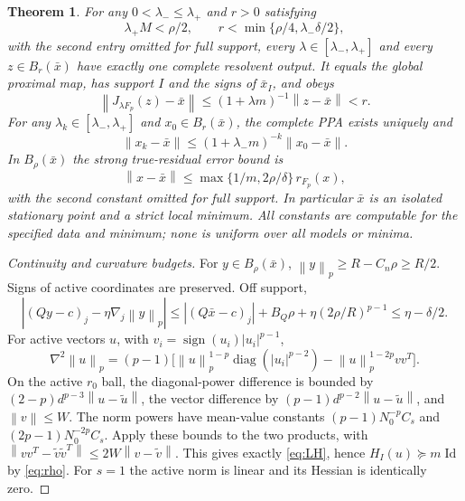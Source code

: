 \documentclass[11pt]{article}
\newcommand{\norm}[1]{\left\lVert#1\right\rVert}
\newcommand{\Id}{\operatorname{Id}}
\newtheorem{theorem}{Theorem}[section]
\theoremstyle{remark}\newtheorem{remark}[theorem]{Remark}
\begin{document}
\begin{theorem}\label{thm:fullprox}
For any $0<\lambda_-\le\lambda_+$ and $r>0$ satisfying
\begin{equation}\label{eq:windows}
 \lambda_+ M<\rho/2,\qquad
 r<\min\{\rho/4,\lambda_-\delta/2\},
\end{equation}
with the second entry omitted for full support, every
$\lambda\in[\lambda_-,\lambda_+]$ and every $z\in B_r(\bar x)$ have
exactly one complete resolvent output. It equals the global proximal
map, has support $I$ and the signs of $\bar x_I$, and obeys
\begin{equation}\label{eq:linear}
 \norm{J_{\lambda F_p}(z)-\bar x}
 \le(1+\lambda m)^{-1}\norm{z-\bar x}<r.
\end{equation}
For any $\lambda_k\in[\lambda_-,\lambda_+]$ and $x_0\in B_r(\bar x)$,
the complete PPA exists uniquely and
\[
 \norm{x_k-\bar x}\le(1+\lambda_-m)^{-k}\norm{x_0-\bar x}.
\]
In $B_\rho(\bar x)$ the strong true-residual error bound is
\begin{equation}\label{eq:linearEB}
 \norm{x-\bar x}\le\max\{1/m,2\rho/\delta\}\,r_{F_p}(x),
\end{equation}
with the second constant omitted for full support. In particular
$\bar x$ is an isolated stationary point and a strict local minimum.
All constants are computable for the specified data and minimum;
none is uniform over all models or minima.
\end{theorem}
\begin{proof}[Continuity and curvature budgets]
For $y\in B_\rho(\bar x)$, $\norm y_p\ge R-C_n\rho\ge R/2$.
Signs of active coordinates are preserved. Off support,
\[
 |(Qy-c)_j-\eta\nabla_j\norm y_p|
 \le |(Q\bar x-c)_j|+B_Q\rho+
                           \eta(2\rho/R)^{p-1}\le\eta-\delta/2.
\]
For active vectors $u$, with $v_i=\operatorname{sign}(u_i)|u_i|^{p-1}$,
\[
 \nabla^2\norm u_p=(p-1)
 \big[\norm u_p^{1-p}\operatorname{diag}(|u_i|^{p-2})
                  -\norm u_p^{1-2p}vv^T\big].
\]
On the active $r_0$ ball, the diagonal-power difference is bounded by
$(2-p)d^{p-3}\norm{u-\tilde u}$, the vector difference by
$(p-1)d^{p-2}\norm{u-\tilde u}$, and $\norm v\le W$.
The norm powers have mean-value constants
$(p-1)N_0^{-p}C_s$ and $(2p-1)N_0^{-2p}C_s$.
Apply these bounds to the two products, with
$\norm{vv^T-\tilde v\tilde v^T}\le2W\norm{v-\tilde v}$.
This gives exactly \eqref{eq:LH}, hence
$H_I(u)\succeq m\Id$ by \eqref{eq:rho}. For $s=1$ the active norm is
linear and its Hessian is identically zero.
\end{proof}
\end{document}
